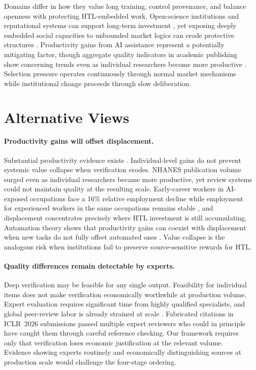 \documentclass{article}
\theoremstyle{plain}
\theoremstyle{definition}
\theoremstyle{remark}
\begin{document}
Domains differ in how they value long training, control provenance, and balance openness with protecting HTL-embedded work. Open-science institutions and reputational systems can support long-term investment \citep{PARTHA1994487}, yet exposing deeply embedded social capacities to unbounded market logics can erode protective structures \citep{polanyi1944greattransformation}. Productivity gains from AI assistance \citep{doi:10.1126/science.adh2586, DellAcqua2023NavigatingTJ, Chen_2025, doi:10.1126/science.adj0998, Chatterji2025How} represent a potentially mitigating factor, though aggregate quality indicators in academic publishing show concerning trends even as individual researchers become more productive \citep{suchak-etal-2025-explosion, maupin-etal-2025-dramatic}. Selection pressure operates continuously through normal market mechanisms while institutional change proceeds through slow deliberation.

\section{Alternative Views}
\label{sec:alternative-views}

\paragraph{Productivity gains will offset displacement.}
Substantial productivity evidence exists \citep{doi:10.1126/science.adh2586, 10.1093/qje/qjae044, doi:10.1073/pnas.2305016120}. Individual-level gains do not prevent systemic value collapse when verification erodes. NHANES publication volume surged even as individual researchers became more productive, yet review systems could not maintain quality at the resulting scale. Early-career workers in AI-exposed occupations face a 16\% relative employment decline while employment for experienced workers in the same occupations remains stable \citep{brynjolfsson2025canaries}, and displacement concentrates precisely where HTL investment is still accumulating. Automation theory shows that productivity gains can coexist with displacement when new tasks do not fully offset automated ones \citep{10.1257/jep.33.2.3}. Value collapse is the analogous risk when institutions fail to preserve source-sensitive rewards for HTL.

\paragraph{Quality differences remain detectable by experts.}
Deep verification may be feasible for any single output. Feasibility for individual items does not make verification economically worthwhile at production volume. Expert evaluation requires significant time from highly qualified specialists, and global peer-review labor is already strained at scale \citep{aczel2021estimating}. Fabricated citations in ICLR~2026 submissions passed multiple expert reviewers who could in principle have caught them through careful reference checking. Our framework requires only that verification loses economic justification at the relevant volume. Evidence showing experts routinely and economically distinguishing sources at production scale would challenge the four-stage ordering.
\end{document}
